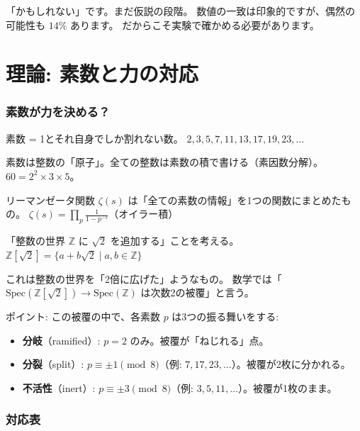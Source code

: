\documentclass[12pt,a4paper]{article}
\begin{document}
\begin{honestbox}[正直に]
「かもしれない」です。まだ仮説の段階。
数値の一致は印象的ですが、偶然の可能性も $14\%$ あります。
だからこそ実験で確かめる必要があります。
\end{honestbox}

\part{理論: 素数と力の対応}

\section{素数が力を決める？}

\begin{storybox}[素数のおさらい]
素数 = 1とそれ自身でしか割れない数。
$2, 3, 5, 7, 11, 13, 17, 19, 23, \ldots$

素数は整数の「原子」。全ての整数は素数の積で書ける（素因数分解）。
$60 = 2^2 \times 3 \times 5$。

リーマンゼータ関数 $\zeta(s)$ は「全ての素数の情報」を1つの関数にまとめたもの。
$\zeta(s) = \prod_p \frac{1}{1-p^{-s}}$（オイラー積）
\end{storybox}

\begin{mathbox}[被覆とは]
「整数の世界 $\mathbb{Z}$ に $\sqrt{2}$ を追加する」ことを考える。
$\mathbb{Z}[\sqrt{2}] = \{a + b\sqrt{2} \mid a, b \in \mathbb{Z}\}$

これは整数の世界を「2倍に広げた」ようなもの。
数学では「$\mathrm{Spec}(\mathbb{Z}[\sqrt{2}]) \to \mathrm{Spec}(\mathbb{Z})$
は次数2の被覆」と言う。

ポイント: この被覆の中で、各素数 $p$ は3つの振る舞いをする:
\begin{itemize}
\item \textbf{分岐}（ramified）: $p = 2$ のみ。被覆が「ねじれる」点。
\item \textbf{分裂}（split）: $p \equiv \pm 1 \pmod{8}$（例: $7, 17, 23, \ldots$）。被覆が2枚に分かれる。
\item \textbf{不活性}（inert）: $p \equiv \pm 3 \pmod{8}$（例: $3, 5, 11, \ldots$）。被覆が1枚のまま。
\end{itemize}
\end{mathbox}

\section{対応表}
\end{document}
